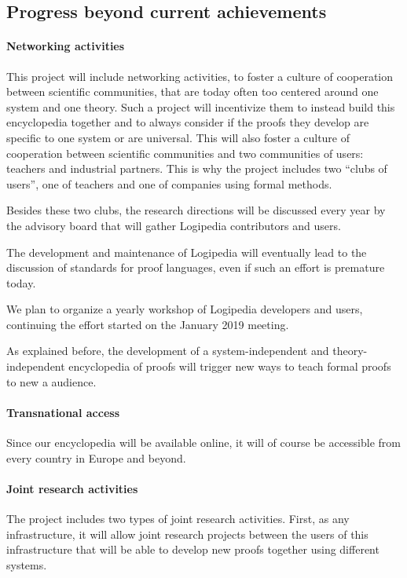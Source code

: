 \subsection{Progress beyond current achievements}


\paragraph{Networking activities}
This project will include networking activities, to foster a culture
of cooperation between scientific communities, that are today often
too centered around one system and one theory. Such a project
will incentivize them to instead build this encyclopedia together and to always
consider if the proofs they develop are specific to one system or are
universal. This will also foster a culture of cooperation between
scientific communities and two communities of users: teachers and
industrial partners. This is why the project includes two ``clubs of
users'', one of teachers and one of companies using formal methods.

Besides these two clubs, the research directions will be discussed every
year by the advisory board that will gather {\sc Logipedia} contributors
and users.

The development and maintenance of {\sc Logipedia} will eventually lead
to the discussion of standards for proof languages, even if such an
effort is premature today.

We plan to organize a yearly workshop of {\sc Logipedia} developers
and users, continuing the effort started on the January 2019 meeting.

As explained before, the development of a system-independent and
theory-independent encyclopedia of proofs will trigger new
ways to teach formal proofs to new a audience.


\paragraph{Transnational access}
Since our encyclopedia will be available online, it will of course be
accessible from every country in Europe and beyond.


\paragraph{Joint research activities}
The project includes two types of joint research activities.  First,
as any infrastructure, it will allow joint research projects
between the users of this infrastructure that will be able to develop
new proofs together using different systems.

